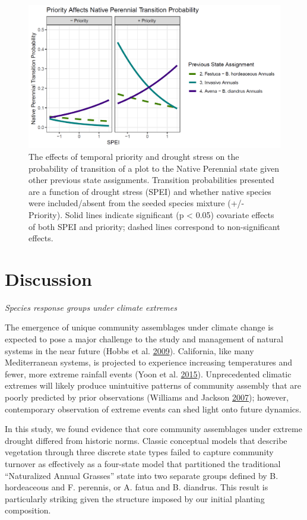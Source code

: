 \documentclass[twoside,12pt,final]{ucthesis-CA2012}
\begin{document}
\begin{ucmainmatter}
\begin{figure}
\includegraphics[width=\textwidth,height=0.4\textheight]{figure/Fig3_4.png}
\caption{The effects of temporal priority and drought stress on the probability of transition of a plot to the Native Perennial state given other previous state assignments. Transition probabilities presented are a function of drought stress (SPEI) and whether native species were included/absent from the seeded species mixture (+/- Priority). Solid lines indicate significant (p \textless{} 0.05) covariate effects of both SPEI and priority; dashed lines correspond to non-significant effects. \label{fig-3-4}}
\end{figure}
\hypertarget{discussion}{%
\section{Discussion}\label{discussion}}

\emph{Species response groups under climate extremes}

The emergence of unique community assemblages under climate change is expected to pose a major challenge to the study and management of natural systems in the near future (Hobbs et al. \protect\hyperlink{ref-Hobbs2009}{2009}).
California, like many Mediterranean systems, is projected to experience increasing temperatures and fewer, more extreme rainfall events (Yoon et al. \protect\hyperlink{ref-Yoon2015}{2015}).
Unprecedented climatic extremes will likely produce unintuitive patterns of community assembly that are poorly predicted by prior observations (Williams and Jackson \protect\hyperlink{ref-Williams2007}{2007}); however, contemporary observation of extreme events can shed light onto future dynamics.

In this study, we found evidence that core community assemblages under extreme drought differed from historic norms.
Classic conceptual models that describe vegetation through three discrete state types failed to capture community turnover as effectively as a four-state model that partitioned the traditional ``Naturalized Annual Grasses'' state into two separate groups defined by B. hordeaceous and F. perennis, or A. fatua and B. diandrus.
This result is particularly striking given the structure imposed by our initial planting composition.


\end{ucmainmatter}
\end{document}
